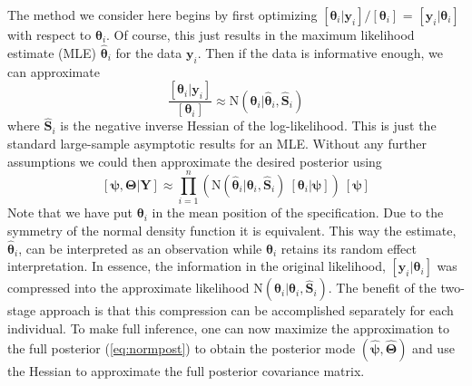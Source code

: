 \documentclass[12pt]{article}
\newcommand{\by}{\mathbf{y}}
\newcommand{\bt}{\boldsymbol{\theta}}
\newcommand{\bT}{\boldsymbol{\Theta}}
\newcommand{\bp}{\boldsymbol{\psi}}
\newcommand{\bS}{\mathbf{S}}
\newcommand{\bY}{\mathbf{Y}}
\begin{document}
The method we consider here begins by first optimizing $[\bt_i|\by_i]/[\bt_i]$ = $[\by_i|\bt_i]$ with respect to $\bt_i$. Of course, this just results in the maximum likelihood estimate (MLE) $\hat{\bt}_i$ for the data $\by_i$. Then if the data is informative enough, we can approximate 
\[
\frac{[\bt_i|\by_i]}{[\bt_i]} \approx \text{N}(\bt_i|\hat{\bt}_i, \hat{\bS}_i)
\]
where $\hat{\bS}_i$ is the negative inverse Hessian of the log-likelihood. This is just the standard large-sample asymptotic results for an MLE. Without any further assumptions we could then approximate the desired posterior using
\begin{equation}
\label{eq:normpost}
[\bp,\bT|\bY] \approx  \prod_{i=1}^n\left(\text{N}(\hat{\bt}_i|\bt_i, \hat{\bS}_i)\ [\bt_i|\bp]\right)\ [\bp]
\end{equation}
Note that we have put $\bt_i$ in the mean position of the specification. Due to the symmetry of the normal density function it is equivalent. This way the estimate, $\hat{\bt}_i$, can be interpreted as an observation while $\bt_i$ retains its random effect interpretation. In essence, the information in the original likelihood, $[\by_i|\bt_i]$ was compressed into the approximate likelihood $\text{N}(\hat{\bt}_i|\bt_i, \hat{\bS}_i)$. The benefit of the two-stage approach is that this compression can be accomplished separately for each individual. To make full inference, one can now maximize the approximation to the full posterior (\ref{eq:normpost}) to obtain the posterior mode $(\hat{\bp},\hat{\bT})$ and use the Hessian to approximate the full posterior covariance matrix. 
\end{document}
